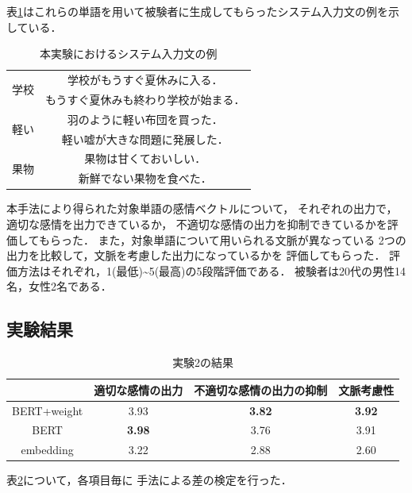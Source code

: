 		表\ref{table:jikken2_input_example}はこれらの単語を用いて被験者に生成してもらったシステム入力文の例を示している．
		\begin{table}[H]
			\centering
			\caption{本実験におけるシステム入力文の例}
			\label{table:jikken2_input_example}
			\begin{tabular}{|c|c|}
				\hline
				\multirow{2}{*}{学校} & 学校がもうすぐ夏休みに入る． \\
				\cline{2-2}
				& もうすぐ夏休みも終わり学校が始まる． \\
				\hline
				\multirow{2}{*}{軽い} & 羽のように軽い布団を買った． \\
				\cline{2-2}
				& 軽い嘘が大きな問題に発展した． \\
				\hline
				\multirow{2}{*}{果物} & 果物は甘くておいしい． \\
				\cline{2-2}
				& 新鮮でない果物を食べた． \\
				\hline
			\end{tabular}
		\end{table}
			
		本手法により得られた対象単語の感情ベクトルについて，
		それぞれの出力で，適切な感情を出力できているか，
		不適切な感情の出力を抑制できているかを評価してもらった．
		また，対象単語について用いられる文脈が異なっている
		2つの出力を比較して，文脈を考慮した出力になっているかを
		評価してもらった．
		評価方法はそれぞれ，1(最低)\textasciitilde5(最高)の5段階評価である．
		被験者は20代の男性14名，女性2名である．


	\subsection{実験結果}
	\begin{table}[H]
		\centering
		\caption{実験2の結果}
		\label{table:normal_word_result}
			\begin{tabular}{cccc}
				\hline
				& 適切な感情の出力 & 不適切な感情の出力の抑制 & 文脈考慮性 \\
				\hline \hline
				BERT+weight & 3.93 & \textbf{3.82} & \textbf{3.92} \\
				BERT & \textbf{3.98} & 3.76 & 3.91 \\
				embedding & 3.22 & 2.88 & 2.60 \\
				\hline
			\end{tabular}
	\end{table}

	表\ref{table:normal_word_result}について，各項目毎に
	手法による差の検定を行った．
